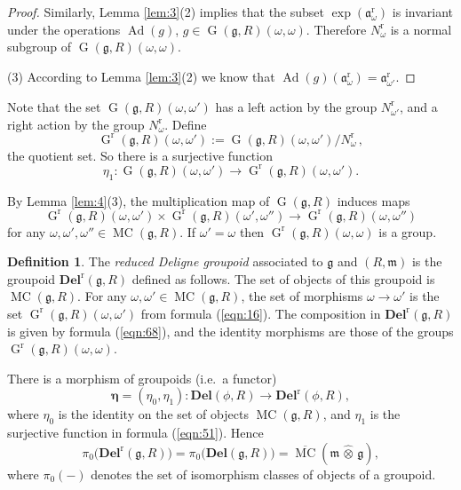 \documentclass[a4paper,10pt]{amsart}
\theoremstyle{definition}
\newtheorem{dfn}[equation]{Definition}
\numberwithin{equation}{section}
\newcommand{\opn}{\operatorname}
\newcommand{\ol}{\overline}
\newcommand{\mfrak}[1]{\mathfrak{#1}}
\newcommand{\mbf}[1]{\mathbf{#1}}
\newcommand{\mrm}[1]{\mathrm{#1}}
\newcommand{\bsym}[1]{\boldsymbol{#1}}
\newcommand{\what}[1]{\widehat{#1}}
\newcommand{\hatotimes}{\, \what{\otimes} \,}
\newcommand{\g}{\mfrak{g}}
\newcommand{\m}{\mfrak{m}}
\renewcommand{\a}{\mfrak{a}}
\newcommand{\om}{\omega}
\newcommand{\lb}{\linebreak}
\begin{document}
\begin{proof}
Similarly, Lemma \ref{lem:3}(2) implies that the subset
$\exp(\a^{\mrm{r}}_{\om})$ is
invariant under the operations $\opn{Ad}(g)$, 
$g \in \opn{G}(\g, R)(\om, \om)$. Therefore $N^{\mrm{r}}_{\om}$ is a
normal subgroup of $\opn{G}(\g, R)(\om, \om)$.

(3) According to Lemma \ref{lem:3}(2) we know that 
$\opn{Ad}(g)(\a^{\mrm{r}}_{\om}) = \a^{\mrm{r}}_{\om'}$.
\end{proof}

Note that the set 
$\opn{G}(\g, R)(\om, \om')$ has a left action by the group 
$N^{\mrm{r}}_{\om'}$, and a right action by the group
$N^{\mrm{r}}_{\om}$. Define
\begin{equation} \label{eqn:16}
\opn{G}^{\mrm{r}}(\g, R)(\om, \om') := 
\opn{G}(\g, R)(\om, \om') / N^{\mrm{r}}_{\om} \, ,
\end{equation}
the quotient set. So there is a surjective function 
\begin{equation} \label{eqn:51}
\eta_1 : \opn{G}(\g, R)(\om, \om') \to \opn{G}^{\mrm{r}}(\g, R)(\om, \om') . 
\end{equation}

By Lemma \ref{lem:4}(3), the multiplication map of 
$\opn{G}(\g, R)$ induces maps
\begin{equation} \label{eqn:68}
\opn{G}^{\mrm{r}}(\g, R)(\om, \om') \times 
\opn{G}^{\mrm{r}}(\g, R)(\om', \om'') \to
\opn{G}^{\mrm{r}}(\g, R)(\om, \om'')
\end{equation}
for any $\om, \om', \om'' \in \opn{MC}(\g, R)$.
If $\om' = \om$ then 
$\opn{G}^{\mrm{r}}(\g, R)(\om, \om)$ is a group.

\begin{dfn}
The {\em reduced Deligne groupoid} associated to $\g$ and $(R, \m)$
is the \lb groupoid $\mbf{Del}^{\mrm{r}}(\g, R)$ defined as follows. 
The set of objects of this groupoid is $\opn{MC}(\g, R)$. For any 
$\om, \om' \in \opn{MC}(\g, R)$, the set of morphisms $\om \to \om'$ is 
the set $\opn{G}^{\mrm{r}}(\g, R)(\om, \om')$
from formula (\ref{eqn:16}). The composition in $\mbf{Del}^{\mrm{r}}(\g, R)$
is given by formula (\ref{eqn:68}), and the identity morphisms are those of the
groups $\opn{G}^{\mrm{r}}(\g, R)(\om, \om)$.
\end{dfn}

There is a morphism of groupoids (i.e.\ a functor)
\begin{equation} \label{eqn:13}
\bsym{\eta} = (\eta_0, \eta_1) : \mbf{Del}(\phi, R) \to
\mbf{Del}^{\mrm{r}}(\phi, R) ,
\end{equation}
where $\eta_0$ is the identity on the set of objects
$\opn{MC}(\g, R)$, and $\eta_1$ is the surjective function in formula
(\ref{eqn:51}).  Hence 
\begin{equation} \label{eqn:5}
\pi_0 \bigl( \mbf{Del}^{\mrm{r}}(\g, R) \bigr) =
\pi_0 \bigl( \mbf{Del}(\g, R) \bigr) =
\ol{\opn{MC}}(\m \hatotimes \g)  ,
\end{equation}
where $\pi_0(-)$ denotes the set of isomorphism classes of objects of a
groupoid.
\end{document}
